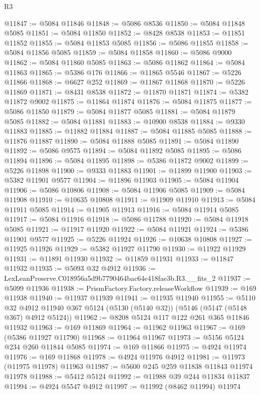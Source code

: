 \begin{lexlean}{R3}
\begin{coremodule}
@11847 := @5084 @11846
@11848 := @5086 @8536
@11850 := @5084 @11848 @5085
@11851 := @5084 @11850
@11852 := @8428 @8538
@11853 := @11851 @11852
@11855 := @5084 @11853 @5085
@11856 := @5086 @11855
@11858 := @5084 @11856 @5085
@11859 := @5084 @11858
@11860 := @5086 @9000
@11862 := @5084 @11860 @5085
@11863 := @5086 @11862
@11864 := @5084 @11863
@11865 := @5386 @176
@11866 := @11865 @5546
@11867 := @5226 @11866
@11868 := @6627 @252
@11869 := @11867 @11868
@11870 := @5226 @11869
@11871 := @8431 @8538
@11872 := @11870 @11871
@11874 := @5382 @11872 @9002
@11875 := @11864 @11874
@11876 := @5084 @11875
@11877 := @5086 @11850
@11879 := @5084 @11877 @5085
@11881 := @5084 @11879 @5085
@11882 := @5084 @11881
@11883 := @10900 @8538
@11884 := @9330 @11883
@11885 := @11882 @11884
@11887 := @5084 @11885 @5085
@11888 := @11876 @11887
@11890 := @5084 @11888 @5085
@11891 := @5084 @11890
@11892 := @5086 @9575
@11894 := @5084 @11892 @5085
@11895 := @5086 @11894
@11896 := @5084 @11895
@11898 := @5386 @11872 @9002
@11899 := @5226 @11898
@11900 := @9333 @11883
@11901 := @11899 @11900
@11903 := @5382 @11901 @9577
@11904 := @11896 @11903
@11905 := @5084 @11904
@11906 := @5086 @10806
@11908 := @5084 @11906 @5085
@11909 := @5084 @11908
@11910 := @10635 @10808
@11911 := @11909 @11910
@11913 := @5084 @11911 @5085
@11914 := @11905 @11913
@11916 := @5084 @11914 @5085
@11917 := @5084 @11916
@11918 := @5086 @11788
@11920 := @5084 @11918 @5085
@11921 := @11917 @11920
@11922 := @5084 @11921
@11924 := @5386 @11901 @9577
@11925 := @5226 @11924
@11926 := @10638 @10808
@11927 := @11925 @11926
@11929 := @5382 @11927 @11790
@11930 := @11922 @11929
@11931 := @11891 @11930
@11932 := @11859 @11931
@11933 := @11847 @11932
@11935 := @5093 @32 @4912
@11936 := LexLeanPreserve.C018956a5d9b7790464bac64e418fae3b.R3.__fits_2
@11937 := @5099 @11936
@11938 := PrismFactory.Factory.releaseWorkflow
@11939 := @169 @11938
@11940 := @11937 @11939
@11941 := @11935 @11940
@11955 := @5110
    @32
    @4912
    @11940
    @367
    @5124
    (@5130 (@5140 @32))
    (@5146 (@5147 (@5148 @367) @4912 @5124))
@11962 := @8208 @5124 @117 @122 @261 @365 @11846 @11932
@11963 := @169 @11869
@11964 := @11962 @11963
@11967 := @169 (@5386 @11927 @11790)
@11968 := @11964 @11967
@11973 := @5156 @5124 @234 @260 @11844 @5085
@11974 := @169 @11866
@11975 := @4924 @11974
@11976 := @169 @11868
@11978 := @4924 @11976 @4912
@11981 := @11973 (@11975 @11978) @11963
@11987 := @5600 @245 @259 @11838 @11843 @11974 @11978
@11988 := @5412 @5124
@11992 := @11988 @39 @244 @11834 @11837
@11994 := @4924 @5547 @4912
@11997 := @11992 (@8462 @11994) @11974

\end{coremodule}
\end{lexlean}
